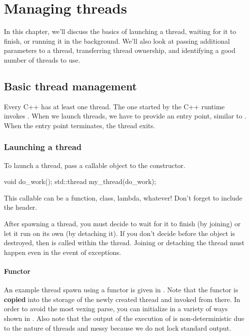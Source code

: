 \section{Managing threads}
In this chapter, we'll discuss the basics of launching a thread, waiting for it to finish, or running it in the background. We'll also look at passing additional parameters to a thread, transferring thread ownership, and identifying a good number of threads to use.

\subsection{Basic thread management}
Every C++ has at least one thread. The one started by the C++ runtime invokes . When we launch threads, we have to provide an entry point, similar to . When the entry point terminates, the thread exits.

\subsubsection{Launching a thread}
To launch a thread, pass a callable object to the  constructor. 

\begin{CPP}
void do_work();
std::thread my_thread(do_work);
\end{CPP}

This callable can be a function, class, lambda, whatever! Don't forget to include the  header.

After spawning a thread, you must decide to wait for it to finish (by joining) or let it run on its own (by detaching it). If you don't decide before the  object is destroyed, then  is called within the thread. Joining or detaching the thread must happen even in the event of exceptions.

\paragraph{Functor}
An example thread spawn using a functor is given in . Note that the functor is \textbf{copied} into the storage of the newly created thread and invoked from there. In order to avoid the most vexing parse, you can initialize in a variety of ways shown in . Also note that the output of the execution of  is non-deterministic due to the nature of threads and messy because we do not lock standard output.

